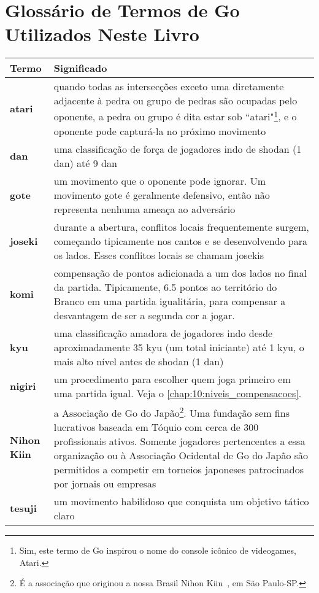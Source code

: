 \chapter[Glossário de Termos de Go]{Glossário de Termos de Go Utilizados Neste Livro}

\begin{longtable}{l|p{85mm}} 
 \hline
 \textbf{Termo} & \textbf{Significado} \\
 \hline \hline
 \textbf{atari} & quando todas as intersecções exceto uma diretamente adjacente à pedra ou grupo de pedras são ocupadas pelo oponente, a pedra ou grupo é dita estar sob ``atari"\footnote{Sim, este termo de Go inspirou o nome do console icônico de videogames, Atari.}, e o oponente pode capturá-la no próximo movimento \\ 
 \hline
 \textbf{dan} & uma classificação de força de jogadores indo de shodan (1 dan) até 9 dan \\
 \hline
 \textbf{gote} & um movimento que o oponente pode ignorar. Um movimento gote é geralmente defensivo, então não representa nenhuma ameaça ao adversário \\
 \hline
 \textbf{joseki} & durante a abertura, conflitos locais frequentemente surgem, começando tipicamente nos cantos e se desenvolvendo para os lados. Esses conflitos locais se chamam josekis \\
 \hline
 \textbf{komi} & compensação de pontos adicionada a um dos lados no final da partida. Tipicamente, 6.5 pontos ao território do Branco em uma partida igualitária, para compensar a desvantagem de ser a segunda cor a jogar. \\
 \hline
 \textbf{kyu} & uma classificação amadora de jogadores indo desde aproximadamente 35 kyu (um total iniciante) até 1 kyu, o mais alto nível antes de shodan (1 dan) \\
 \hline
 \textbf{nigiri} & um procedimento para escolher quem joga primeiro em uma partida igual. Veja o \autoref{chap:10:niveis_compensacoes}. \\
 \hline
 \textbf{Nihon Kiin} & a Associação de Go do Japão\footnote{É a associação que originou a nossa Brasil Nihon Kiin~\cite{brasil_nihon_kiin}, em São Paulo-SP.}. Uma fundação sem fins lucrativos baseada em Tóquio com cerca de 300 profissionais ativos. Somente jogadores pertencentes a essa organização ou à Associação Ocidental de Go do Japão são permitidos a competir em torneios japoneses patrocinados por jornais ou empresas \\
 \hline
 \textbf{tesuji} & um movimento habilidoso que conquista um objetivo tático claro \\

\end{longtable}
